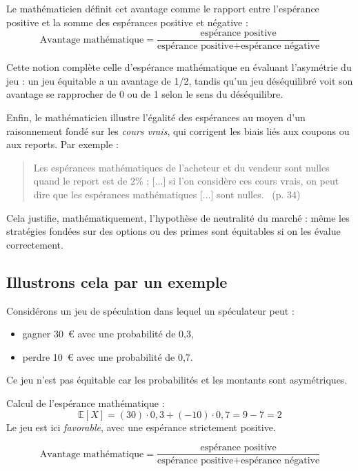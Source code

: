 \documentclass[12pt,a4paper]{article}
\begin{document}
\medskip

Le mathématicien définit cet avantage comme le rapport entre l’espérance positive et la somme des espérances positive et négative :
\[
\text{Avantage mathématique} = \frac{\text{espérance positive}}{\text{espérance positive} + \text{espérance négative}}
\]

Cette notion complète celle d’espérance mathématique en évaluant l’asymétrie du jeu : un jeu équitable a un avantage de 1/2, tandis qu’un jeu déséquilibré voit son avantage se rapprocher de 0 ou de 1 selon le sens du déséquilibre.

Enfin, le mathématicien illustre l’égalité des espérances au moyen d’un raisonnement fondé sur les \textit{cours vrais}, qui corrigent les biais liés aux coupons ou aux reports. Par exemple :
\begin{quote}
    \og Les espérances mathématiques de l’acheteur et du vendeur sont nulles quand le report est de 2\% ; [...] si l’on considère ces cours vrais, on peut dire que les espérances mathématiques [...] sont nulles. \fg\ (p. 34)
\end{quote}

Cela justifie, mathématiquement, l’hypothèse de neutralité du marché : même les stratégies fondées sur des options ou des primes sont équitables si on les évalue correctement.

\subsection{Illustrons cela par un exemple}

Considérons un jeu de spéculation dans lequel un spéculateur peut :
\begin{itemize}
    \item gagner 30~€ avec une probabilité de 0{,}3,
    \item perdre 10~€ avec une probabilité de 0{,}7.
\end{itemize}

Ce jeu n’est pas équitable car les probabilités et les montants sont asymétriques.

\medskip

Calcul de l’espérance mathématique :
\[
\mathbb{E}[X] = (30) \cdot 0{,}3 + (-10) \cdot 0{,}7 = 9 - 7 = 2
\]
Le jeu est ici \textit{favorable}, avec une espérance strictement positive.

\medskip

\[
\text{Avantage mathématique} = \frac{\text{espérance positive}}{\text{espérance positive} + \text{espérance négative}}
\]
\end{document}
